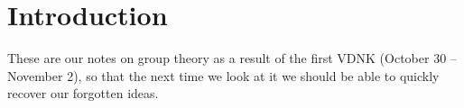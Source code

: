 \chapter{Introduction}

These are our notes on group theory as a result of the first VDNK (October 30
-- November 2), so that the next time we look at it we should be able to
quickly recover our forgotten ideas. 
